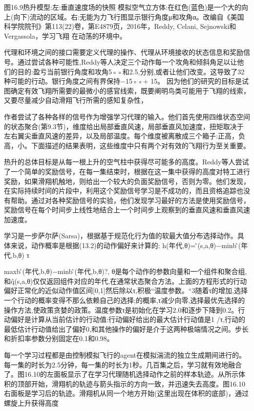  
图16.9热升模型:左:垂直速度场的快照
模拟空气立方体:在红色(蓝色)是一个大的向上(向下)流动的区域。右:无能为力飞行图显示银行角度μ和攻角α。改编自《美国科学院院刊》第113(22)卷，第E4879页，2016年，Reddy, Celani, Sejnowski和Vergassola，学习飞翔
在动荡的环境中。


代理和环境之间的接口需要定义代理的操作、代理从环境接收的状态信息和奖励信号。通过尝试各种可能性,Reddy等人决定三个动作每一个攻角和倾斜角足以让他们的目的:盈亏当前银行角度和攻角5◦◦和2.5,分别,或者让他们改变。这导致了32种可能的行动。银行角度之间有界保持−15◦◦+ 15。
因为他们的研究的目标是试图确定有效飞翔所需要的最微小的感官线索，既要阐明鸟类可能用于飞翔的线索，又要尽量减少自动滑翔飞行所需的感知复杂性，

作者尝试了各种各样的信号作为增强学习代理的输入。他们首先使用四维状态空间的状态聚合(第9.3节)，维度给出局部垂直风速，局部垂直风加速度，扭矩取决于左右翼尖垂直风速的差异，以及局部温度。每个维度被离散成三个箱子:正高，负高，小。下面描述的结果表明，这些维度中只有两个对有效的飞翔行为至关重要。

热升的总体目标是从每一根上升的空气柱中获得尽可能多的高度。Reddy等人尝试了一个简单的奖励信号，在每一集结束时，根据在这一集中获得的高度对特工进行奖励，如果滑翔机触地，则给出一个较大的负面奖励信号，否则为零。他们发现，在实际持续时间的片段中，利用这个奖励信号学习是不成功的，而且资格追踪也没有帮助。通过对各种奖励信号的实验，他们发现学习最好的方法是使用奖励信号，奖励信号在每个时间步上线性地结合上一个时间步上观察到的垂直风速和垂直风速加速度。

学习是一步萨尔萨(Sarsa)，根据基于规范化行为值的软最大值分布选择动作。具体来说，动作概率是根据(13.2)的动作偏好来计算的:
h(年代,θ)=问̂(s,a,θ)−minb问̂(年代,b,θ)
τ

maxb问̂(年代,b,θ)−minb问̂(年代,b,θ)?,
θ是每个动作的参数向量和一个组件和聚合组,和q̂(s,a,θ)仅仅返回组件对应的年代,在通常状态聚合方法。上面的方程形式的行动偏好正常化的近似动作值区间[0,1]然后除以τ,积极“温度参数。“3随着τ的增加,选择一个行动的概率变得不那么依赖自己的选择;的概率,τ减少向零,选择最优先选择的操作方法,使政策贪婪的政策。温度参数τ是初始化在学习2.0和逐步下降到0.2。行动偏好是计算从当前估计的行动值:行动偏好给出的最大估计行动值是1 /τ,行动的最低估计行动值给出了偏好0,和其他操作的偏好是介于这两种极端情况之间。步长和折扣率参数分别固定在0.1和0.98。

每一个学习过程都是由控制模拟飞行的agent在模拟湍流的独立生成期间进行的。每一集的时长为2.5分钟，每一集的时长为1秒。几百集之后，学习就有效地融合了。图16.10的左面板显示了在学习代理随机选择动作之前的样本轨迹。从所示体积的顶部开始，滑翔机的轨迹与箭头指示的方向一致，并迅速失去高度。图16.10右面板是学习后的轨迹。滑翔机从同一个地方开始(这里出现在体积的底部)，通过螺旋上升获得高度

